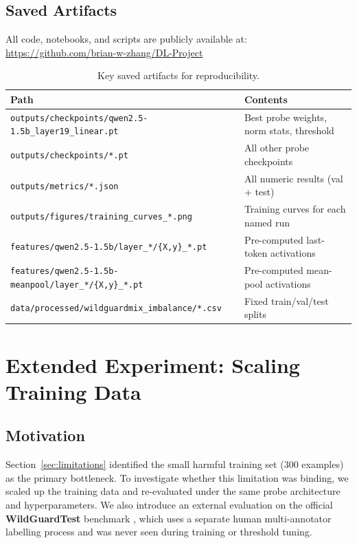 \documentclass[11pt,a4paper]{article}
\begin{document}
\subsection{Saved Artifacts}

All code, notebooks, and scripts are publicly available at:
\url{https://github.com/brian-w-zhang/DL-Project}


\begin{table}[H]
\centering
\caption{Key saved artifacts for reproducibility.}
\label{tab:artifacts}
\begin{tabular}{ll}
\toprule
Path & Contents \\
\midrule
\texttt{outputs/checkpoints/qwen2.5-1.5b\_layer19\_linear.pt} & Best probe weights, norm stats, threshold \\
\texttt{outputs/checkpoints/*.pt} & All other probe checkpoints \\
\texttt{outputs/metrics/*.json} & All numeric results (val + test) \\
\texttt{outputs/figures/training\_curves\_*.png} & Training curves for each named run \\
\texttt{features/qwen2.5-1.5b/layer\_*/\{X,y\}\_*.pt} & Pre-computed last-token activations \\
\texttt{features/qwen2.5-1.5b-meanpool/layer\_*/\{X,y\}\_*.pt} & Pre-computed mean-pool activations \\
\texttt{data/processed/wildguardmix\_imbalance/*.csv} & Fixed train/val/test splits \\
\bottomrule
\end{tabular}
\end{table}

\section{Extended Experiment: Scaling Training Data}
\label{sec:extended}

\subsection{Motivation}

Section~\ref{sec:limitations} identified the small harmful training set (300 examples)
as the primary bottleneck. To investigate whether this limitation was binding, we scaled
up the training data and re-evaluated under the same probe architecture and hyperparameters.
We also introduce an external evaluation on the official \textbf{WildGuardTest} benchmark
\citep{wildguard}, which uses a separate human multi-annotator labelling process and was
never seen during training or threshold tuning.
\end{document}
